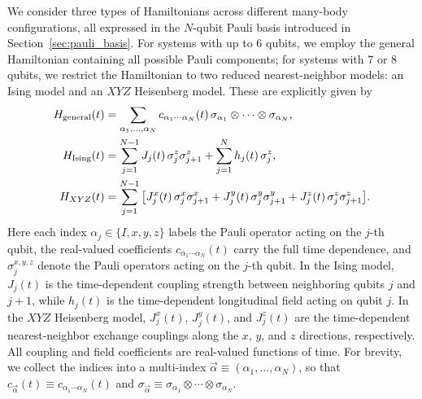 We consider three types of Hamiltonians across different many-body configurations, all expressed in the $N$-qubit Pauli basis introduced in Section~\ref{sec:pauli_basis}. For systems with up to 6 qubits, we employ the general Hamiltonian containing all possible Pauli components; for systems with 7 or 8 qubits, we restrict the Hamiltonian to two reduced nearest-neighbor models: an Ising model and an $XYZ$ Heisenberg model. These are explicitly given by
\begin{align}
H_{\mathrm{general}}(t)
&=
\sum_{\alpha_1,\ldots,\alpha_N}
c_{\alpha_1 \cdots \alpha_N}(t)\,
\sigma_{\alpha_1}\otimes\cdots\otimes\sigma_{\alpha_N},
\label{eq:res-H-general}
\\
H_{\mathrm{Ising}}(t)
&=
\sum_{j=1}^{N-1}
J_j(t)\,
\sigma_j^z \sigma_{j+1}^z
+
\sum_{j=1}^{N}
h_j(t)\,
\sigma_j^z,
\label{eq:res-H-ising}
\\
H_{XYZ}(t) &= \sum_{j=1}^{N-1} \qty[
J_j^x(t)\, \sigma_j^x \sigma_{j+1}^x
+ J_j^y(t)\, \sigma_j^y \sigma_{j+1}^y
+ J_j^z(t)\, \sigma_j^z \sigma_{j+1}^z ].
\label{eq:res-H-xyz}
\end{align}
Here each index $\alpha_j \in \{ I, x, y, z \}$ labels the Pauli operator acting on the $j$-th qubit, the real-valued coefficients $c_{\alpha_1 \cdots \alpha_N}(t)$ carry the full time dependence, and $\sigma_j^{x,y,z}$ denote the Pauli operators acting on the $j$-th qubit. In the Ising model, $J_j(t)$ is the time-dependent coupling strength between neighboring qubits $j$ and $j+1$, while $h_j(t)$ is the time-dependent longitudinal field acting on qubit $j$. In the $XYZ$ Heisenberg model, $J_j^x(t)$, $J_j^y(t)$, and $J_j^z(t)$ are the time-dependent nearest-neighbor exchange couplings along the $x$, $y$, and $z$ directions, respectively. All coupling and field coefficients are real-valued functions of time. For brevity, we collect the indices into a multi-index $\vec{\alpha} \equiv (\alpha_1, \ldots, \alpha_N)$, so that $c_{\vec{\alpha}}(t) \equiv c_{\alpha_1 \cdots \alpha_N}(t)$ and $\sigma_{\vec{\alpha}} \equiv \sigma_{\alpha_1} \otimes \cdots \otimes \sigma_{\alpha_N}$.

